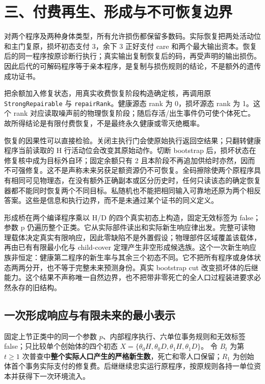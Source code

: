 \documentclass[
  11pt,
  oneside]{book}
\begin{document}
\section{三、付费再生、形成与不可恢复边界}\label{ux4e09ux4ed8ux8d39ux518dux751fux5f62ux6210ux4e0eux4e0dux53efux6062ux590dux8fb9ux754c}

对两个程序及两种身体类型，所有允许损伤都保留多数码。实际恢复把两处活动位和主门复原，损坏初态支付 3，余下 3 正好支付 care 和两个最大输出资本。恢复后的同一程序按原诊断行执行；真实输出复制恢复后的码，再受声明的输出损伤。因此后代的可解码程序等于亲本程序，是复制与损伤规则的结论，不是额外的遗传成功证书。

把余额加入修复状态，用真实收费恢复阶段构造确定核，再调用原 \nolinkurl{StrongRepairable} 与 \texttt{repairRank}。健康源态 rank 为 0，损坏源态 rank 为 1。这个 rank 对应读取噪声前的物理恢复阶段；随后存活/出生事件仍可使个体死亡。故所得结论是有限付费恢复，不是最终永久健康或零灭绝概率。

恢复的因果性可以直接检验。关闭主执行门会使原始执行返回空结果；只翻转健康程序当前读取的 H 行活动位会改变其原始动作。切断 bootstrap 后，损坏状态在修复核中成为目标外自环；固定余额只有 2 且本阶段不再追加供给时亦然，因而不可强修复。这不是声称未来另获足额资源仍不可恢复。全码擦除使两个原程序具有相同可见物理态，在没有额外正确副本或区分历史时，任何只读该态的确定恢复器都不能同时恢复两个不同目标。私随机也不能把相同输入可靠地还原为两个相反答案。这些是信息和执行边界，而不是未通过某个证书的同义定义。

形成桥在两个编译程序乘以 H/D 的四个真实初态上构造，固定无效标签为 false；参数 p 仍遍历整个正类。它从实际部件读出和实际新生响应律出发。完整可读物理载体决定真实有限响应，因此零缺陷不是外置假设；物理部件区域覆盖该载体，再由已有有限最小化与 child-cover 定理产生非空形成候选族。这个一次新生响应族非恒定：健康第二程序的新生率与其余三个初态不同。它不把所有程序或身体状态两两分开，也不等于完整未来预测身份。真实 bootstrap cut 改变损坏体的后继能力。这个结果不声称唯一自然边界，也不把带非零死亡的全人口过程装进要求必然永存的旧结构。

\subsection{一次形成响应与有限未来的最小表示}\label{task-dependent-representation}

固定上节正类中的同一个参数 \(p\)、内部程序执行、六单位事务规则和无效标签 false；只比较单个创始体的四个初态 \(X=\{\theta_0H,\theta_0D,\theta_1H,\theta_1D\}\)。 令 \(B_t\) 为第 \(t\ge1\) 次普查中\textbf{整个实际人口产生的严格新生数}，死亡和零人口保留；\(R_1\) 为创始体首个事务实际支付的修复费。后继继续忠实运行原程序，按原规则各持一单位资本并获得下一次环境流入。
\end{document}
